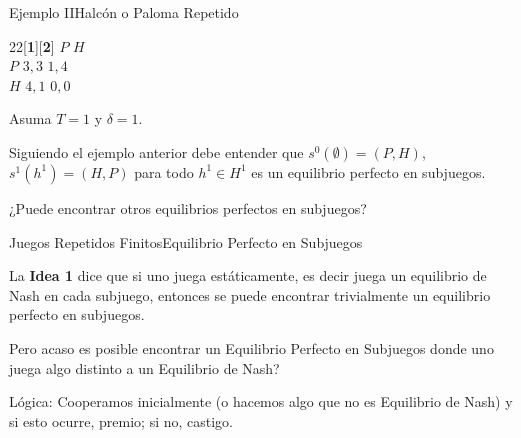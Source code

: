 \documentclass[notes, 11pt]{beamer} %
\newenvironment{wideitemize}{\itemize\addtolength{\itemsep}{10pt}}{\enditemize}
\begin{document}
\begin{frame}{Ejemplo II}{Halc\'on o Paloma Repetido}
\begin{center}
	 \begin{game}{2}{2}[\textbf{1}][\textbf{2}]
                  \>$P$         \>$H$\\
        $P$       \>$3,3$       \>$1,4$\\
        $H$       \>$4,1$       \>$0,0$
 \end{game}
 \end{center}

	\begin{wideitemize}
		\item<1-> Asuma $T=1$ y $\delta=1$.
		\item<2-> Siguiendo el ejemplo anterior debe entender que $s^{0}(\emptyset) = (P,H)$, $s^{1}(h^{1}) = (H,P)$ para todo $h^{1} \in H^{1}$ es un equilibrio perfecto en subjuegos.
		\item<3-> ¿Puede encontrar otros equilibrios perfectos en subjuegos?
	\end{wideitemize}
\end{frame}

\begin{frame}{Juegos Repetidos Finitos}{Equilibrio Perfecto en Subjuegos}
	\begin{wideitemize}
		\item<1-> La \textbf{Idea 1} dice que si uno juega est\'aticamente, es decir juega un equilibrio de Nash en cada subjuego, entonces se puede encontrar trivialmente un equilibrio perfecto en subjuegos.

		\item<2-> Pero acaso es posible encontrar un Equilibrio Perfecto en Subjuegos donde uno juega algo distinto a un Equilibrio de Nash? 
		\begin{wideitemize}
			\item<3->[*] L\'ogica: Cooperamos inicialmente (o hacemos algo que no es Equilibrio de Nash) y si esto ocurre, premio; si no, castigo.
		\end{wideitemize}

	\end{wideitemize}
\end{frame}
\end{document}
